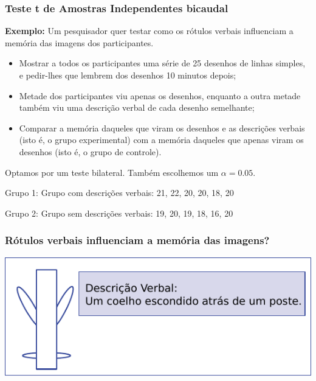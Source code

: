 \documentclass[11pt]{beamer}
\begin{document}
\begin{frame}
\frametitle{Teste t de Amostras Independentes bicaudal}

\textbf{Exemplo:} Um pesquisador quer testar como os rótulos verbais influenciam a memória das imagens dos participantes. 
 
\begin{itemize}
\item Mostrar a todos os participantes uma série de 25 desenhos de linhas simples, e pedir-lhes que lembrem dos desenhos 10 minutos depois;
\item Metade dos participantes viu apenas os desenhos, enquanto a outra metade também viu uma descrição verbal de cada desenho semelhante;
\item Comparar a memória daqueles que viram os desenhos e as descrições verbais (isto é, o grupo experimental) com a memória daqueles que apenas viram os desenhos (isto é, o grupo de controle).
\end{itemize}

Optamos por um teste bilateral. Também escolhemos um \(\alpha=0.05\).

Grupo 1: Grupo com descrições verbais:
21, 22, 20, 20, 18, 20

Grupo 2: Grupo sem descrições verbais:
19, 20, 19, 18, 16, 20

\end{frame}

\begin{frame}
\frametitle{Rótulos verbais influenciam a memória das imagens?}

\begin{center}\includegraphics[width=0.9\linewidth]{figs/fig10.1} \end{center}

\end{frame}
\end{document}
